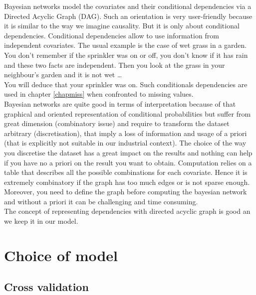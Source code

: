 \documentclass[12pt,a4paper]{report}
\begin{document}
		Bayesian networks \cite{heckerman1995learning,jensen2007bayesian,friedman2000using} model the covariates and their conditional dependencies via a Directed Acyclic Graph (DAG). Such an orientation is very user-friendly because it is similar to the way we imagine causality. But it is only about conditional dependencies. Conditional dependencies allow to use information from independent covariates. The usual example is the case of wet grass in a garden. You don't remember if the sprinkler was on or off, you don't know if it has rain and these two facts are independent. Then you look at the grass in your neighbour's garden and it is not wet \dots \\
		You will deduce that your sprinkler was on. Such conditionals dependencies are used in chapter \ref{chapmiss} when confronted to missing values. \\
		Bayesian networks are quite good in terms of interpretation because of that graphical and oriented representation of conditional probabilities but suffer from great dimension (combinatory issue) and require to transform the dataset arbitrary (discretisation), that imply a loss of information and usage of a priori (that is explicitly not suitable in our industrial context). The choice of the way you discretise the dataset has a great impact on the results and nothing can help if you have no a priori on the result you want to obtain. Computation relies on a table that describes all the possible combinations for each covariate. Hence it is extremely combinatory if the graph has too much edges or is not sparse enough. Moreover, you need to define the graph before computing the bayesian network and without a priori it can be challenging and time consuming.\\
The concept of representing dependencies with directed acyclic graph is good an we keep it in our model.		
			
	

		\section{Choice of model}
			\subsection{Cross validation}
				
\end{document}
